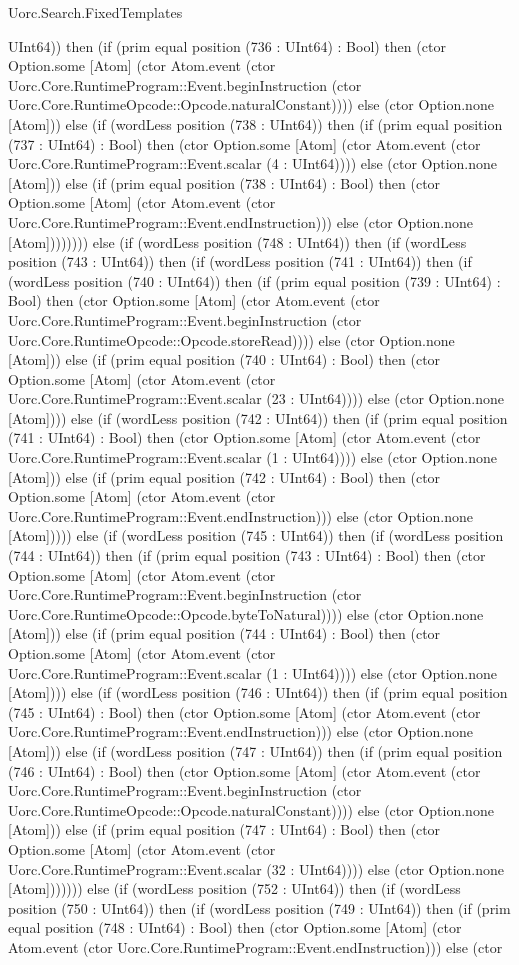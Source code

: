 \begin{lexlean}{Uorc.Search.FixedTemplates}
\begin{semanticmodule}
{UInt64)) then (if (prim equal position (736 : UInt64) : Bool) then (ctor Option.some [Atom] (ctor Atom.event (ctor Uorc.Core.RuntimeProgram::Event.beginInstruction (ctor Uorc.Core.RuntimeOpcode::Opcode.naturalConstant)))) else (ctor Option.none [Atom])) else (if (wordLess position (738 : UInt64)) then (if (prim equal position (737 : UInt64) : Bool) then (ctor Option.some [Atom] (ctor Atom.event (ctor Uorc.Core.RuntimeProgram::Event.scalar (4 : UInt64)))) else (ctor Option.none [Atom])) else (if (prim equal position (738 : UInt64) : Bool) then (ctor Option.some [Atom] (ctor Atom.event (ctor Uorc.Core.RuntimeProgram::Event.endInstruction))) else (ctor Option.none [Atom]))))))) else (if (wordLess position (748 : UInt64)) then (if (wordLess position (743 : UInt64)) then (if (wordLess position (741 : UInt64)) then (if (wordLess position (740 : UInt64)) then (if (prim equal position (739 : UInt64) : Bool) then (ctor Option.some [Atom] (ctor Atom.event (ctor Uorc.Core.RuntimeProgram::Event.beginInstruction (ctor Uorc.Core.RuntimeOpcode::Opcode.storeRead)))) else (ctor Option.none [Atom])) else (if (prim equal position (740 : UInt64) : Bool) then (ctor Option.some [Atom] (ctor Atom.event (ctor Uorc.Core.RuntimeProgram::Event.scalar (23 : UInt64)))) else (ctor Option.none [Atom]))) else (if (wordLess position (742 : UInt64)) then (if (prim equal position (741 : UInt64) : Bool) then (ctor Option.some [Atom] (ctor Atom.event (ctor Uorc.Core.RuntimeProgram::Event.scalar (1 : UInt64)))) else (ctor Option.none [Atom])) else (if (prim equal position (742 : UInt64) : Bool) then (ctor Option.some [Atom] (ctor Atom.event (ctor Uorc.Core.RuntimeProgram::Event.endInstruction))) else (ctor Option.none [Atom])))) else (if (wordLess position (745 : UInt64)) then (if (wordLess position (744 : UInt64)) then (if (prim equal position (743 : UInt64) : Bool) then (ctor Option.some [Atom] (ctor Atom.event (ctor Uorc.Core.RuntimeProgram::Event.beginInstruction (ctor Uorc.Core.RuntimeOpcode::Opcode.byteToNatural)))) else (ctor Option.none [Atom])) else (if (prim equal position (744 : UInt64) : Bool) then (ctor Option.some [Atom] (ctor Atom.event (ctor Uorc.Core.RuntimeProgram::Event.scalar (1 : UInt64)))) else (ctor Option.none [Atom]))) else (if (wordLess position (746 : UInt64)) then (if (prim equal position (745 : UInt64) : Bool) then (ctor Option.some [Atom] (ctor Atom.event (ctor Uorc.Core.RuntimeProgram::Event.endInstruction))) else (ctor Option.none [Atom])) else (if (wordLess position (747 : UInt64)) then (if (prim equal position (746 : UInt64) : Bool) then (ctor Option.some [Atom] (ctor Atom.event (ctor Uorc.Core.RuntimeProgram::Event.beginInstruction (ctor Uorc.Core.RuntimeOpcode::Opcode.naturalConstant)))) else (ctor Option.none [Atom])) else (if (prim equal position (747 : UInt64) : Bool) then (ctor Option.some [Atom] (ctor Atom.event (ctor Uorc.Core.RuntimeProgram::Event.scalar (32 : UInt64)))) else (ctor Option.none [Atom])))))) else (if (wordLess position (752 : UInt64)) then (if (wordLess position (750 : UInt64)) then (if (wordLess position (749 : UInt64)) then (if (prim equal position (748 : UInt64) : Bool) then (ctor Option.some [Atom] (ctor Atom.event (ctor Uorc.Core.RuntimeProgram::Event.endInstruction))) else (ctor }
\end{semanticmodule}
\end{lexlean}
